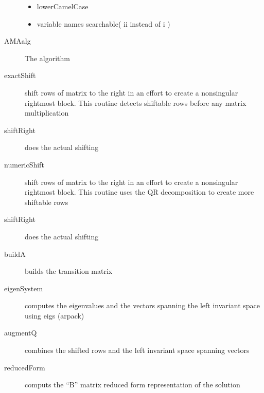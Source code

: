 \documentclass[12pt]{article}
\begin{document}
\begin{description}
  \begin{itemize}
  \item lowerCamelCase
  \item variable names searchable( ii instead of i )
  \end{itemize}


\item[AMAalg] The algorithm

\item[exactShift] shift rows of matrix to the right in an effort to create a nonsingular rightmost block. This routine detects shiftable rows before any matrix multiplication
\item[shiftRight]  does the actual shifting 
\item[numericShift] shift rows of matrix to the right in an effort to create a nonsingular rightmost block. This routine uses the QR decomposition to create  more shiftable rows
\item[shiftRight] does the actual shifting 
\item[buildA] builds the transition matrix
\item[eigenSystem] computes the eigenvalues and the vectors spanning the left invariant space using eigs (arpack)
\item[augmentQ] combines the shifted rows and the left invariant space spanning vectors
\item[reducedForm] computs the ``B'' matrix reduced form representation of the solution



\end{description}
\end{document}
